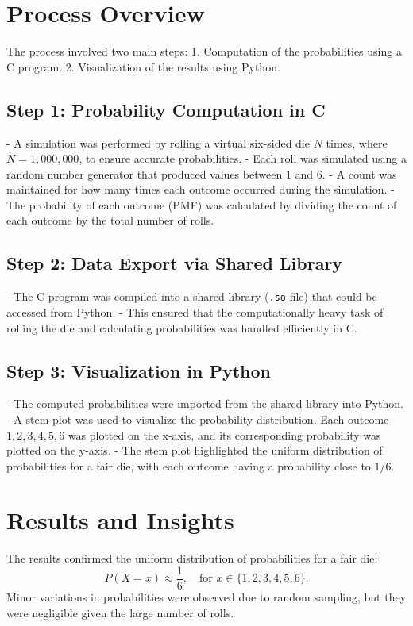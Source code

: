 \documentclass[journal]{IEEEtran}
\begin{document}
\section*{Process Overview}
The process involved two main steps: 
1. Computation of the probabilities using a C program.
2. Visualization of the results using Python.

\subsection*{Step 1: Probability Computation in C}
- A simulation was performed by rolling a virtual six-sided die \(N\) times, where \(N = 1,000,000\), to ensure accurate probabilities.
- Each roll was simulated using a random number generator that produced values between \(1\) and \(6\).
- A count was maintained for how many times each outcome occurred during the simulation.
- The probability of each outcome (PMF) was calculated by dividing the count of each outcome by the total number of rolls.

\subsection*{Step 2: Data Export via Shared Library}
- The C program was compiled into a shared library (\texttt{.so} file) that could be accessed from Python.
- This ensured that the computationally heavy task of rolling the die and calculating probabilities was handled efficiently in C.

\subsection*{Step 3: Visualization in Python}
- The computed probabilities were imported from the shared library into Python.
- A stem plot was used to visualize the probability distribution. Each outcome \(1, 2, 3, 4, 5, 6\) was plotted on the x-axis, and its corresponding probability was plotted on the y-axis.
- The stem plot highlighted the uniform distribution of probabilities for a fair die, with each outcome having a probability close to \(1/6\).

\section*{Results and Insights}
The results confirmed the uniform distribution of probabilities for a fair die:
\[
P(X = x) \approx \frac{1}{6}, \quad \text{for } x \in \{1, 2, 3, 4, 5, 6\}.
\]
Minor variations in probabilities were observed due to random sampling, but they were negligible given the large number of rolls.
\end{document}
